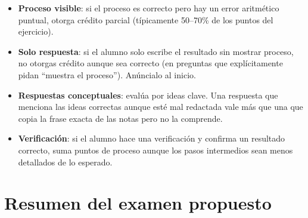 \documentclass[12pt, oneside]{article}
\begin{document}
\begin{notaprofesor}
  \begin{itemize}
    \item \textbf{Proceso visible}: si el proceso es correcto pero hay un error
          aritmético puntual, otorga crédito parcial (típicamente 50--70\% de
          los puntos del ejercicio).
    \item \textbf{Solo respuesta}: si el alumno solo escribe el resultado sin
          mostrar proceso, no otorgas crédito aunque sea correcto (en preguntas
          que explícitamente pidan ``muestra el proceso'').  Anúncialo al inicio.
    \item \textbf{Respuestas conceptuales}: evalúa por ideas clave.  Una respuesta
          que menciona las ideas correctas aunque esté mal redactada vale más que
          una que copia la frase exacta de las notas pero no la comprende.
    \item \textbf{Verificación}: si el alumno hace una verificación y confirma
          un resultado correcto, suma puntos de proceso aunque los pasos
          intermedios sean menos detallados de lo esperado.
  \end{itemize}
\end{notaprofesor}

\section{Resumen del examen propuesto}
\end{document}

